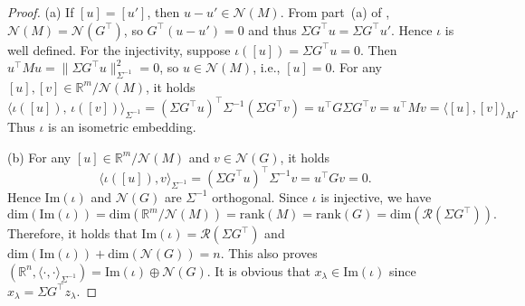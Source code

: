 \documentclass[]{myarticle}
\begin{document}
\begin{proof}
  (a) If $[u] = [u']$, then $u - u' \in \mathcal{N}(M)$. From part~(a) of , $\mathcal{N}(M) = \mathcal{N}(G^\top)$, so $G^\top(u - u') = 0$ and thus $\Sigma G^\top u = \Sigma G^\top u'$. Hence $\iota$ is well defined. For the injectivity, suppose $\iota([u]) = \Sigma G^\top u = 0$. Then $u^\top M u = \|\Sigma G^\top u\|_{\Sigma^{-1}}^2 = 0$, so $u \in \mathcal{N}(M)$, i.e., $[u] = 0$.  For any $[u], [v] \in \mathbb{R}^m/\mathcal{N}(M)$, it holds
  \[\langle \iota([u]),\, \iota([v]) \rangle_{\Sigma^{-1}} = (\Sigma G^\top u)^\top \Sigma^{-1} (\Sigma G^\top v)
  = u^\top G \Sigma G^\top v = u^\top M v = \langle [u],[v]\rangle_M.\] 
  Thus $\iota$ is an isometric embedding.

  (b) For any $[u]\in\mathbb R^m/\mathcal N(M)$ and $v\in\mathcal N(G)$, it holds 
  \begin{equation*}
    \langle \iota([u]),v\rangle_{\Sigma^{-1}}= (\Sigma G^{\top}u)^{\top}\Sigma^{-1} v 
    = u^{\top}Gv = 0.
  \end{equation*}
  Hence $\mathrm{Im}(\iota)$ and $\mathcal{N}(G)$ are $\Sigma^{-1}$ orthogonal. Since $\iota$ is injective, we have
  \[\mathrm{dim}(\mathrm{Im}(\iota))=\mathrm{dim}(\mathbb R^m/\mathcal N(M))
  =\mathrm{rank}(M)=\mathrm{rank}(G)=\mathrm{dim}(\mathcal{R}(\Sigma G^{\top})). \] 
  Therefore, it holds that $\mathrm{Im}(\iota)=\mathcal{R}(\Sigma G^\top)$ and $\mathrm{dim}(\mathrm{Im}(\iota))+\mathrm{dim}(\mathcal{N}(G))=n$. This also proves $(\mathbb R^n,\langle\cdot,\cdot\rangle_{\Sigma^{-1}})
  = \mathrm{Im}(\iota) \oplus \mathcal{N}(G)$. It is obvious that $x_{\lambda}\in\mathrm{Im}(\iota)$ since $x_{\lambda}=\Sigma G^{\top}z_{\lambda}$.


\end{proof}
\end{document}
